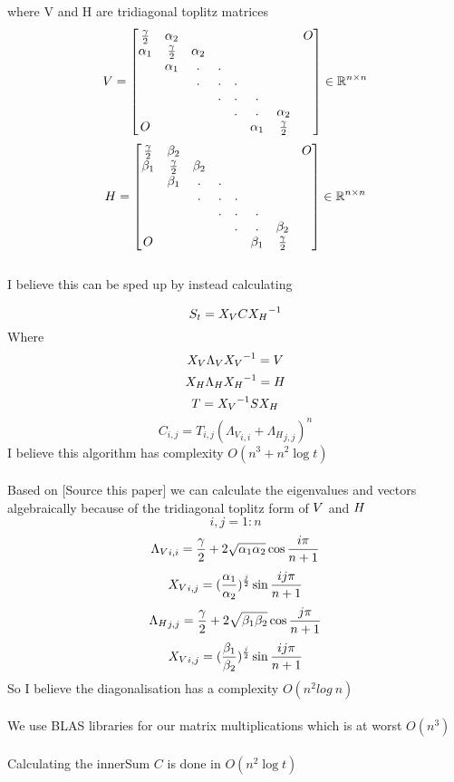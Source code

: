 \documentclass{article}
\begin{document}
where V and H are tridiagonal toplitz matrices 
\[ V = 
\begin{bmatrix}
	\frac{\gamma}{2} & \alpha_{2} & & & & & & O \\ 
	\alpha_{1} & \frac{\gamma}{2} & \alpha_{2} & & & & & \\
	& \alpha_{1} & . & . & & & & \\
	& &  . & . & . & & &  \\
	& & & . & . & . & & \\
	& & & & . & .& \alpha_{2} \\
	O & & & & &  \alpha_{1} & \frac{\gamma}{2}
\end{bmatrix} \in \mathbb{R}^{n\times n} \]
\[H = 
\begin{bmatrix}
	\frac{\gamma}{2} & \beta_{2} & & & & & & O \\ 
	\beta_{1} & \frac{\gamma}{2} & \beta_{2} & & & & & \\
	& \beta_{1} & . & . & & & & \\
	& &  . & . & . & & &  \\
	& & & . & . & . & & \\
	& & & & . & .& \beta_{2} \\
	O & & & & &  \beta_{1} & \frac{\gamma}{2}
\end{bmatrix} \in \mathbb{R}^{n\times n}\] \\ 
I believe this can be sped up by instead calculating
\newcommand{\innerSum}{C}
\newcommand{\verticalBasis}{{X_V}}
\newcommand{\verticalEigens}{{\Lambda_V}}
\newcommand{\horizontalBasis}{{X_H}}
\newcommand{\horizontalEigens}{{\Lambda_H}}
\newcommand{\transformedSourceGrid}{T}

\[ \sourceGrid_t = \verticalBasis \innerSum \horizontalBasis^{-1} \] 
Where
\[\verticalBasis \verticalEigens \verticalBasis^{-1} = \verticalBands \]
\[\horizontalBasis \horizontalEigens \horizontalBasis^{-1} = \horizontalBands\]
\[\transformedSourceGrid = \verticalBasis^{-1} \sourceGrid \horizontalBasis\]
\[\innerSum_{i,j} = \transformedSourceGrid_{i,j} (\verticalEigens_{i,i} + \horizontalEigens_{j,j})^n\]
I believe this algorithm has complexity $O(n^3 + n^2\log t)$ \\ \\
Based on [Source this paper] we can calculate the eigenvalues and vectors 
algebraically because of the tridiagonal toplitz form of $V$ and $H$ 
\[ i,j = 1:n\]
\[ \verticalEigens_{i,i} = \frac{\stencilMiddle}{2} + 2\sqrt{\stencilTop \stencilBottom}\cos{\frac{i\pi}{n+1}}\]
\[ \verticalBasis_{i,j} = (\frac{\stencilTop}{\stencilBottom})^{\frac{j}{2}}\sin{\frac{ij\pi}{n+1}} \]
\[ \horizontalEigens_{j,j} = \frac{\stencilMiddle}{2} + 2\sqrt{\stencilLeft \stencilRight}\cos{\frac{j\pi}{n+1}} \]
\[ \verticalBasis_{i,j} = (\frac{\stencilLeft}{\stencilRight})^{\frac{j}{2}}\sin{\frac{ij\pi}{n+1}} \]
So I believe the diagonalisation has a complexity $O(n^2 log{\>n})$ \\ \\
We use BLAS libraries for our matrix multiplications which is at worst $O(n^3)$ \\ \\
Calculating the innerSum $\innerSum$ is done in $O(n^2\log{t})$
\end{document}
